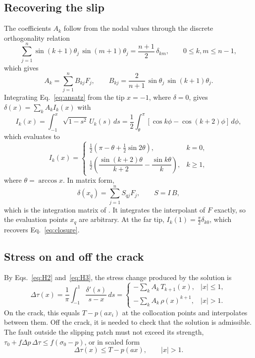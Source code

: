 \documentclass[12pt]{article}
\begin{document}
\subsection{Recovering the slip}
The coefficients $A_k$ follow from the nodal values through the discrete
orthogonality relation
\begin{equation*}
	\sum_{j=1}^{n}\sin(k+1)\theta_j\,\sin(m+1)\theta_j = \frac{n+1}{2}\,\delta_{km},
	\qquad 0\le k,m\le n-1,
\end{equation*}
which gives
\begin{equation}\label{eq:B}
	A_k = \sum_{j=1}^{n} B_{kj}F_j, \qquad
	B_{kj} = \frac{2}{n+1}\,\sin\theta_j\,\sin(k+1)\theta_j .
\end{equation}
Integrating Eq.~\eqref{eq:ansatz} from the tip $x=-1$, where $\delta=0$, gives
$\delta(x) = \sum_k A_k I_k(x)$ with
\begin{equation*}
	I_k(x) = \int_{-1}^{x}\sqrt{1-s^2}\,U_k(s)\,ds
	= \frac12\int_\theta^\pi[\cos k\phi - \cos(k+2)\phi]\,d\phi,
\end{equation*}
which evaluates to
\begin{equation*}
	I_k(x) = \begin{cases}
		\frac12\left(\pi-\theta+\frac12\sin2\theta\right), & k=0,\\[3pt]
		\frac12\left(\dfrac{\sin(k+2)\theta}{k+2} - \dfrac{\sin k\theta}{k}\right), & k\ge1,
	\end{cases}
\end{equation*}
where $\theta=\arccos x$. In matrix form,
\begin{equation}\label{eq:S}
	\delta(x_q) = \sum_{j=1}^{n} S_{qj}F_j, \qquad S = I\,B,
\end{equation}
which is the integration matrix of \textcite[Sec.~2.4, Tables~2 and
4]{ViescaGaragash2018}. It integrates the interpolant of $F$ exactly, so the
evaluation points $x_q$ are arbitrary. At the far tip, $I_k(1) = \frac\pi2\delta_{k0}$,
which recovers Eq.~\eqref{eq:closure}.

\subsection{Stress on and off the crack}\label{sec:stress}
By Eqs.~\eqref{eq:H2} and~\eqref{eq:H3}, the stress change produced by the
solution is
\begin{equation}\label{eq:stress}
	\Delta\tau(x) = \frac1\pi\int_{-1}^{1}\frac{\delta'(s)}{s-x}\,ds =
	\begin{cases}
		-\sum_k A_k\,T_{k+1}(x),     & |x|\le1, \\
		-\sum_k A_k\,\rho(x)^{k+1}, & |x|>1 .
	\end{cases}
\end{equation}
On the crack, this equals $T-p(ax_i)$ at the collocation points and interpolates
between them. Off the crack, it is needed to check that the solution is
admissible. The fault outside the slipping patch must not exceed its strength,
$\tau_0+f\Delta p\,\Delta\tau \le f(\sigma_0 - p)$, or in scaled form
\begin{equation}\label{eq:admissible}
	\Delta\tau(x) \le T - p(ax), \qquad |x|>1 .
\end{equation}
\end{document}
